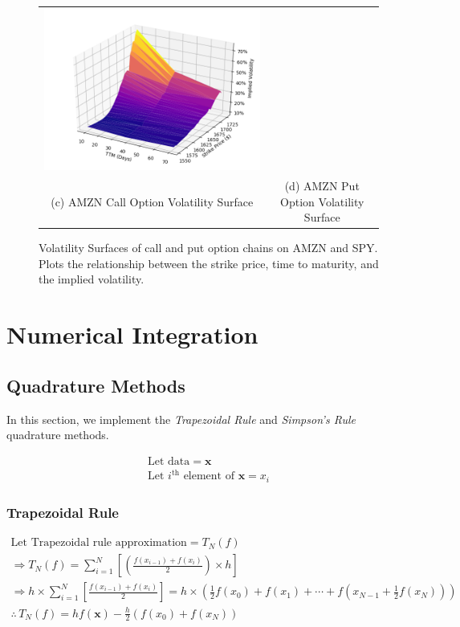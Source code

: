 \documentclass[10pt]{article}
\begin{document}
\begin{figure}
\begin{tabular}{|c|c|}
                \includegraphics[width=.47\textwidth]{bin/vol_surface/AMZN_Put_3DVolSurface.png} \\
                (c) AMZN Call Option Volatility Surface &
                (d) AMZN Put Option Volatility Surface \\
                \hline
            \end{tabular}
            \label{fig:volatility_surfaces}
            \caption{Volatility Surfaces of call and put option chains on AMZN and SPY. Plots the relationship between the strike price, time to maturity, and the implied volatility.}
        \end{figure}


\newpage
\section{Numerical Integration}

    \subsection{Quadrature Methods}
    In this section, we implement the \textit{Trapezoidal Rule} and \textit{Simpson's Rule} quadrature methods.

    \begin{gather*}
        \text{Let data} = \boldsymbol{x} \\
        \text{Let $i^\text{th}$ element of $\boldsymbol{x}$} = x_i
    \end{gather*}

        \subsubsection{Trapezoidal Rule}

        \begin{gather*}
            \text{Let Trapezoidal rule approximation} = T_N(f) \\
            \Rightarrow T_N(f)
            = \sum_{i=1}^{N} \left[ \left( \frac{f(x_{i-1}) + f(x_i)}{2} \right) \times h \right] \\
            \Rightarrow h \times \sum_{i=1}^N \left[ \frac{f(x_{i-1}) + f(x_i)}{2} \right]
            = h \times \left( \frac{1}{2}f(x_0) + f(x_1) + \cdots + f(x_{N-1} + \frac{1}{2}f(x_N))\right) \\
            \therefore \, T_N(f) = hf(\boldsymbol{x}) - \frac{h}{2}(f(x_0) + f(x_N))
        \end{gather*}
        
\end{document}
